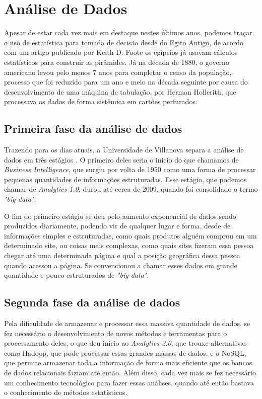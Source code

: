 \section{Análise de Dados}

\indent
\par Apesar de estar cada vez mais em destaque nestes últimos anos, podemos traçar o uso de estatística para tomada de decisão desde do Egito Antigo, de acordo com um artigo publicado por Keith D. Foote \cite{Foote2018} os egípcios já usavam cálculos estatísticos para construir as pirâmides. Já na década de 1880, o governo americano levou pelo menos 7 anos para completar o censo da população, processo que foi reduzido para um ano e meio na década seguinte por causa do desenvolvimento de uma máquina de tabulação, por Herman Hollerith, que processava os dados de forma sistêmica em cartões perfurados.

\subsection{Primeira fase da análise de dados}

\indent
\par Trazendo para os dias atuais, a Universidade de Villanova separa a análise de dados em três estágios \cite{Villanova}. O primeiro deles seria o início do que chamamos de \textit{Business Intelligence}, que surgiu por volta de 1950 como uma forma de processar pequenas quantidades de informações estruturadas. Esse estágio, que podemos chamar de \textit{Analytics 1.0}, durou até cerca de 2009, quando foi consolidado o termo \textit{"big-data"}.

\par O fim do primeiro estágio se deu pelo aumento exponencial de dados sendo produzidos diariamente, podendo vir de qualquer lugar e forma, desde de informações simples e estruturadas, como quais produtos alguém comprou em um determinado site, ou coisas mais complexas, como quais sites fizeram essa pessoa chegar até uma determinada página e qual a posição geográfica dessa pessoa quando acessou a página. Se convencionou a chamar esses dados em grande quantidade e pouco estruturados de \textit{"big-data"}.

\subsection{Segunda fase da análise de dados}

\indent
\par Pela dificuldade de armazenar e processar essa massiva quantidade de dados, se fez necessário o desenvolvimento de novos métodos e ferramentas para o processamento deles, o que deu início ao \textit{Analytics 2.0}, que trouxe alternativas como Hadoop, que pode processar essas grandes massas de dados, e o NoSQL, que permite armazenar toda a informação de forma mais eficiente que os bancos de dados relacionais faziam até então. Além disso, cada vez mais se fez necessário um conhecimento tecnológico para fazer essas análises, quando até então bastava o conhecimento de métodos estatísticos.

